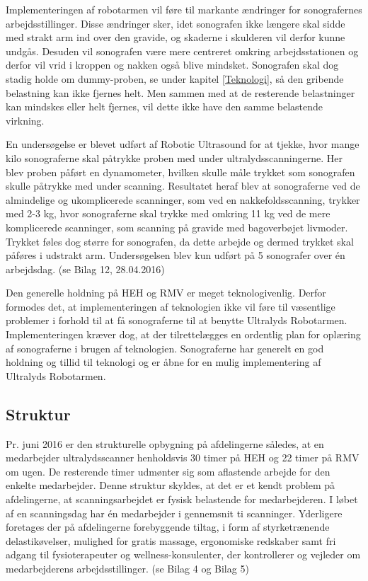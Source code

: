 Implementeringen af robotarmen vil føre til markante ændringer for sonografernes arbejdsstillinger. Disse ændringer sker, idet sonografen ikke længere skal sidde med strakt arm ind over den gravide, og skaderne i skulderen vil derfor kunne undgås. Desuden vil sonografen være mere centreret omkring arbejdsstationen og derfor vil vrid i kroppen og nakken også blive mindsket. Sonografen skal dog stadig holde om dummy-proben, se under kapitel \ref{Teknologi}, så den gribende belastning kan ikke fjernes helt. Men sammen med at de resterende belastninger kan mindskes eller helt fjernes, vil dette ikke have den samme belastende virkning. 

En undersøgelse er blevet udført af Robotic Ultrasound for at tjekke, hvor mange kilo sonograferne skal påtrykke proben med under ultralydsscanningerne. Her blev proben påført en dynamometer, hvilken skulle måle trykket som sonografen skulle påtrykke med under scanning. Resultatet heraf blev at sonograferne ved de almindelige og ukomplicerede scanninger, som ved en nakkefoldsscanning, trykker med 2-3 kg, hvor sonograferne skal trykke med omkring 11 kg ved de mere komplicerede scanninger, som scanning på gravide med bagoverbøjet livmoder. Trykket føles dog større for sonografen, da dette arbejde og dermed trykket skal påføres i udstrakt arm. Undersøgelsen blev kun udført på 5 sonografer over én arbejdsdag. (se Bilag 12, 28.04.2016)

Den generelle holdning på HEH og RMV er meget teknologivenlig. Derfor formodes det, at implementeringen af teknologien ikke vil føre til væsentlige problemer i forhold til at få sonograferne til at benytte Ultralyds Robotarmen. Implementeringen kræver dog, at der tilrettelægges en ordentlig plan for oplæring af sonograferne i brugen af teknologien. Sonograferne har generelt en god holdning og tillid til teknologi og er åbne for en mulig implementering af Ultralyds Robotarmen.

\subsection{Struktur}
Pr. juni 2016 er den strukturelle opbygning på afdelingerne således, at en medarbejder ultralydsscanner henholdsvis 30 timer på HEH og 22 timer på RMV om ugen. De resterende timer udmønter sig som aflastende arbejde for den enkelte medarbejder. Denne struktur skyldes, at det er et kendt problem på afdelingerne, at scanningsarbejdet er fysisk belastende for medarbejderen. I løbet af en scanningsdag har én medarbejder i gennemsnit ti scanninger. Yderligere foretages der på afdelingerne forebyggende tiltag, i form af styrketrænende delastikøvelser, mulighed for gratis massage, ergonomiske redskaber samt fri adgang til fysioterapeuter og wellness-konsulenter, der kontrollerer og vejleder om medarbejderens arbejdsstillinger. (se Bilag 4 og Bilag 5)

